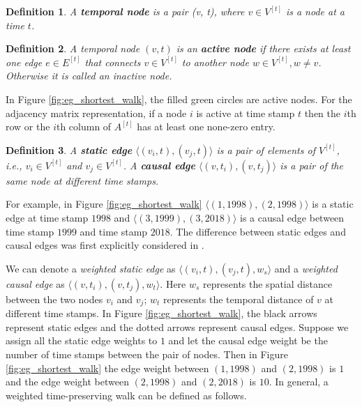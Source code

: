 \documentclass[12pt]{article}
\newtheorem{definition}{Definition}
\theoremstyle{definition}
\begin{document}
\begin{definition}
  A \textbf{temporal node} is a pair (v, t), where $v \in V^{[t]}$ is a node at a time $t$.
\end{definition}


\begin{definition}
  A temporal node $(v, t)$ is an \textbf{active node} if there exists at least one edge $e \in E^{[t]}$ that connects $v \in V^{[t]}$ to another node $w \in V^{[t]}, w\ne v$. Otherwise it is called an inactive node.
\end{definition}

In Figure \ref{fig:eg_shortest_walk}, the filled green circles are active nodes. For the adjacency matrix representation, if a node $i$ is active at time stamp $t$ then
the $i$th row or the $i$th column of $A^{[t]}$ has at least one none-zero entry.

 \begin{definition}
 A \textbf{static edge} $\langle (v_i, t), (v_j, t)\rangle$ is a pair of elements of $V^{[t]}$, i.e., $v_i \in V^{[t]}$ and
 $v_j \in V^{[t]}$.
  A \textbf{causal edge} $\langle (v, t_i), (v, t_j)\rangle$ is a pair of the same node at different time stamps.
 \end{definition}

 For example, in Figure \ref{fig:eg_shortest_walk}
 $\langle (1, 1998), (2, 1998) \rangle$ is a static edge at time stamp $1998$ and $\langle (3, 1999), (3, 2018) \rangle$ is a causal edge between time stamp $1999$ and time stamp $2018$.
 The difference between static edges and causal edges was first explicitly considered in \cite{chen16}.


 We can denote a \emph{weighted static edge} as $\langle (v_i, t), (v_j, t), w_s \rangle$ and a \emph{weighted causal edge} as $\langle (v, t_i), (v, t_j), w_t \rangle$.
 Here $w_s$ represents the spatial distance between the two nodes $v_i$ and $v_j$; $w_t$ represents the
 temporal distance of $v$ at different time stamps.
 In Figure \ref{fig:eg_shortest_walk}, the black arrows represent static edges and the dotted arrows represent causal edges.
 Suppose we assign all the static edge weights to $1$ and
 let the causal edge weight be the number of time stamps between the pair of nodes. Then in Figure \ref{fig:eg_shortest_walk}
 the edge weight between $(1, 1998)$ and $(2, 1998)$ is $1$ and the edge weight between $(2, 1998)$ and $(2, 2018)$ is $10$.
In general, a weighted time-preserving walk can be defined as follows.
\end{document}
